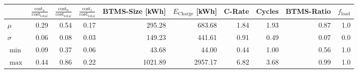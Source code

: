 \begin{tabular}{lrrrrrrrrr}
\toprule
{} &  $\frac{\text{cost}_\text{a}}{\text{cost}_\text{total}}$ &  $\frac{\text{cost}_\text{b}}{\text{cost}_\text{total}}$ &  $\frac{\text{cost}_\text{c}}{\text{cost}_\text{total}}$ &  BTMS-Size [\unit{\kWh}] &  $E_\text{Charge}$ [\unit{\kWh}] &  C-Rate &  Cycles &  BTMS-Ratio &  $f_\text{load}$ \\
\midrule
$\mu$    &                                               0.29 &                                               0.54 &                                               0.17 &                   295.28 &                           683.68 &    1.84 &    1.93 &        0.87 &              1.0 \\
$\sigma$ &                                               0.06 &                                               0.08 &                                               0.03 &                   149.23 &                           441.61 &    0.91 &    0.49 &        0.07 &              0.0 \\
$\min$   &                                               0.09 &                                               0.37 &                                               0.06 &                    43.68 &                            44.00 &    0.44 &    1.00 &        0.56 &              1.0 \\
$\max$   &                                               0.44 &                                               0.86 &                                               0.22 &                  1021.89 &                          2957.17 &    6.82 &    3.68 &        0.99 &              1.0 \\
\bottomrule
\end{tabular}
